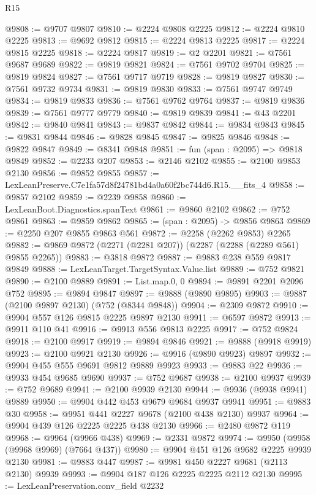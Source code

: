 \begin{lexlean}{R15}
\begin{coremodule}
@9808 := @9707 @9807
@9810 := @2224 @9808 @2225
@9812 := @2224 @9810 @2225
@9813 := @9692 @9812
@9815 := @2224 @9813 @2225
@9817 := @2224 @9815 @2225
@9818 := @2224 @9817
@9819 := @2 @2201
@9821 := @7561 @9687 @9689
@9822 := @9819 @9821
@9824 := @7561 @9702 @9704
@9825 := @9819 @9824
@9827 := @7561 @9717 @9719
@9828 := @9819 @9827
@9830 := @7561 @9732 @9734
@9831 := @9819 @9830
@9833 := @7561 @9747 @9749
@9834 := @9819 @9833
@9836 := @7561 @9762 @9764
@9837 := @9819 @9836
@9839 := @7561 @9777 @9779
@9840 := @9819 @9839
@9841 := @43 @2201
@9842 := @9840 @9841
@9843 := @9837 @9842
@9844 := @9834 @9843
@9845 := @9831 @9844
@9846 := @9828 @9845
@9847 := @9825 @9846
@9848 := @9822 @9847
@9849 := @8341 @9848
@9851 := fun (span : @2095) => @9818 @9849
@9852 := @2233 @207
@9853 := @2146 @2102
@9855 := @2100 @9853 @2130
@9856 := @9852 @9855
@9857 := LexLeanPreserve.C7e1fa57d8f24781bd4a0a60f2bc744d6.R15.__fits_4
@9858 := @9857 @2102
@9859 := @2239 @9858
@9860 := LexLeanBoot.Diagnostics.spanText
@9861 := @9860 @2102
@9862 := @752 @9861
@9863 := @9859 @9862
@9865 := (span : @2095) -> @9856 @9863
@9869 := @2250 @207 @9855 @9863 @561
@9872 := @2258 (@2262 @9853) @2265
@9882 := @9869 @9872 (@2271 (@2281 @207)) (@2287 (@2288 (@2289 @561) @9855 @2265))
@9883 := @3818 @9872
@9887 := @9883 @238 @559 @9817 @9849
@9888 := LexLeanTarget.TargetSyntax.Value.list
@9889 := @752 @9821
@9890 := @2100 @9889
@9891 := List.map.{0, 0}
@9894 := @9891 @2201 @2096 @752
@9895 := @9894 @9847
@9897 := @9888 (@9890 @9895)
@9903 := @9887 (@2100 @9897 @2130) (@752 (@8344 @9848))
@9904 := @2309 @9872
@9910 := @9904 @557 @126 @9815 @2225 @9897 @2130
@9911 := @6597 @9872
@9913 := @9911 @110 @41
@9916 := @9913 @556 @9813 @2225
@9917 := @752 @9824
@9918 := @2100 @9917
@9919 := @9894 @9846
@9921 := @9888 (@9918 @9919)
@9923 := @2100 @9921 @2130
@9926 := @9916 (@9890 @9923) @9897
@9932 := @9904 @455 @555 @9691 @9812 @9889 @9923
@9933 := @9883 @22
@9936 := @9933 @454 @9685 @9690
@9937 := @752 @9687
@9938 := @2100 @9937
@9939 := @752 @9689
@9941 := @2100 @9939 @2130
@9944 := @9936 (@9938 @9941) @9889
@9950 := @9904 @442 @453 @9679 @9684 @9937 @9941
@9951 := @9883 @30
@9958 := @9951 @441 @2227 @9678 (@2100 @438 @2130) @9937
@9964 := @9904 @439 @126 @2225 @2225 @438 @2130
@9966 := @2480 @9872 @119
@9968 := @9964 (@9966 @438)
@9969 := @2331 @9872
@9974 := @9950 (@9958 (@9968 @9969) (@7664 @437))
@9980 := @9904 @451 @126 @9682 @2225 @9939 @2130
@9981 := @9883 @447
@9987 := @9981 @450 @2227 @9681 (@2113 @2130) @9939
@9993 := @9904 @187 @126 @2225 @2225 @2112 @2130
@9995 := LexLeanPreservation.conv_field @2232

\end{coremodule}
\end{lexlean}
